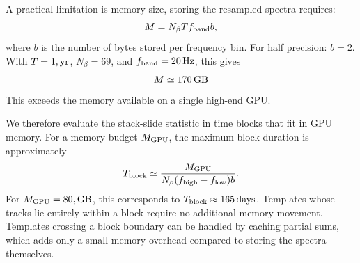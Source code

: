 \documentclass[aps,prd,amsmath,floats,floatfix, twocolumn,
superscriptaddress,nofootinbib,showpacs]{revtex4-2}
\newcommand{\ls}[1]{\textcolor{red}{[LS: #1]}}
\begin{document}
A practical limitation is memory size, storing the resampled spectra requires:
\begin{equation}
M
=
N_\beta Tf_{\rm band}b ,
\end{equation}
where $b$ is the number of bytes stored per frequency bin. For half precision: $b=2$. With $T=1,{\rm yr}$, $N_\beta=69$, and $f_{\rm band}=20\,{\rm Hz}$, this gives
\begin{equation}
M \simeq 170\,{\rm GB}
\end{equation}
This exceeds the memory available on a single high-end GPU.

We therefore evaluate the stack-slide statistic in time blocks that fit in GPU memory. For a memory budget $M_{\rm GPU}$, the maximum block duration is approximately
\begin{equation}
T_{\rm block}
\simeq
\frac{M_{\rm GPU}}
{N_\beta (f_{\rm high}-f_{\rm low})b} .
\end{equation}
For $M_{\rm GPU}=80,{\rm GB}$, this corresponds to $T_{\rm block}\approx 165 \,{\rm days}$. Templates whose tracks lie entirely within a block require no additional memory movement. Templates crossing a block boundary can be handled by caching partial sums, which adds only a small memory overhead compared to storing the spectra themselves.




\end{document}
